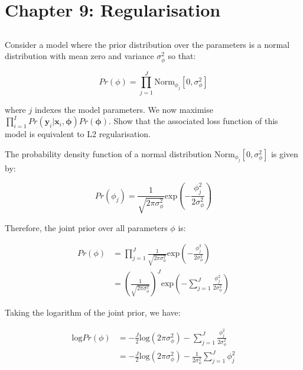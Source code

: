 \documentclass[12pt]{report}
\begin{document}
\section*{Chapter 9: Regularisation}

\subsection{}
\begin{mdframed}
    Consider a model where the prior distribution over the parameters is a normal distribution with mean zero and variance $\sigma_{\phi}^{2}$ so that:

    \begin{equation*}
        Pr(\phi) = \prod_{j=1}^{J}\text{Norm}_{\phi_{j}}[0, \sigma_{\phi}^{2}]
    \end{equation*}

    where $j$ indexes the model parameters. We now maximise $\prod_{i=1}^{I}Pr(\mathbf{y}_{i}|\mathbf{x}_{i}, \boldsymbol{\phi})Pr(\boldsymbol{\phi})$. Show that the associated loss function of this model is equivalent to L2 regularisation.
\end{mdframed}

The probability density function of a normal distribution $\text{Norm}_{\phi_{j}}[0, \sigma_{\phi}^{2}]$ is given by:

\begin{equation*}
    Pr(\phi_{j}) = \frac{1}{\sqrt{2\pi\sigma_{\phi}^{2}}}\text{exp}\left(-\frac{\phi_{j}^{2}}{2\sigma_{\phi}^{2}}\right)
\end{equation*}

Therefore, the joint prior over all parameters $\phi$ is:

\begin{align*}
    Pr(\phi) & = \prod_{j=1}^{J}\frac{1}{\sqrt{2\pi\sigma_{\phi}^{2}}}\text{exp}\left(-\frac{\phi_{j}^{2}}{2\sigma_{\phi}^{2}}\right)                 \\
             & = \left(\frac{1}{\sqrt{2\pi\sigma_{\phi}^{2}}}\right)^{J}\text{exp}\left(-\sum_{j=1}^{J}\frac{\phi_{j}^{2}}{2\sigma_{\phi}^{2}}\right)
\end{align*}

Taking the logarithm of the joint prior, we have:

\begin{align*}
    \text{log}Pr(\phi) & = -\frac{J}{2}\text{log}(2\pi\sigma_{\phi}^{2}) - \sum_{j=1}^{J}\frac{\phi_{j}^{2}}{2\sigma_{\phi}^{2}}  \\
                       & = -\frac{J}{2}\text{log}(2\pi\sigma_{\phi}^{2}) - \frac{1}{2\sigma_{\phi}^{2}}\sum_{j=1}^{J}\phi_{j}^{2}
\end{align*}
\end{document}
